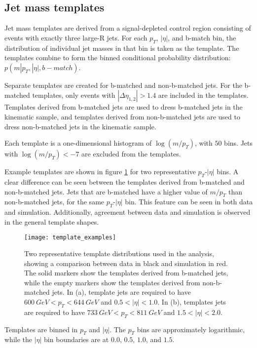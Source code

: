 \subsection{Jet mass templates}
Jet mass templates are derived from a signal-depleted control region
consisting of events with exactly three large-R jets. For each $p_T$,
$|\eta|$, and b-match bin, the distribution of individual jet masses
in that bin is taken as the template. The templates combine to form
the binned conditional probability distribution: $p(m|p_{T}, |\eta|,
b-match)$.

Separate templates are created for b-matched and non-b-matched jets. For the b-matched templates, only events with
$|\Delta \eta_{1,2}| > 1.4$ are included in the templates. Templates
derived from b-matched jets are used to dress b-matched jets in the
kinematic sample, and templates derived from non-b-matched jets are
used to dress non-b-matched jets in the kinematic sample.

Each template is a one-dimensional histogram of $\log\left(m/p_{T}\right)$,
with $50$ bins. Jets with $\log\left(m/p_{T}\right)< -7$ are excluded
from the templates.

Example templates are shown in figure \ref{fig:template_examples} for
two representative $p_{T}$-$|\eta|$ bins. A clear difference can be
seen between the templates derived from b-matched and non-b-matched
jets. Jets that are b-matched have a higher value of $m/p_{T}$ than
non-b-matched jets, for the same  $p_{T}$-$|\eta|$ bin. This feature
can be seen in both data and simulation. Additionally,
agreement between data and simulation is observed in the general
template shapes.

\begin{figure}[h]
\texttt{[image: template\_examples]}
\caption{Two representative template distributions used in the analysis, showing a
  comparison between data in black and simulation in
  red. The solid markers show the templates derived from b-matched
  jets, while the empty markers show the templates derived from
  non-b-matched jets. In (a), template jets are required to have
  $600~GeV < p_{T} < 644~GeV$ and $0.5 <|\eta|<1.0$. In (b), templates
  jets are required to have $733~GeV < p_{T} < 811~GeV$ and $1.5<|\eta|<2.0$.}
\label{fig:template_examples}
\end{figure}

Templates are binned in $p_T$ and $|\eta|$. The $p_T$ bins are
approximately logarithmic, while the $|\eta|$ bin boundaries are at
$0.0$, $0.5$, $1.0$, and $1.5$. 

